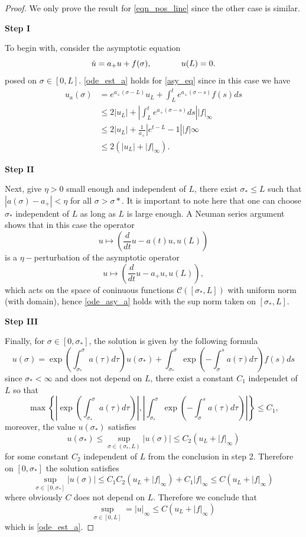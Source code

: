 \documentclass[letterpaper,11pt]{article}
\numberwithin{equation}{section}
\theoremstyle{plain}
\begin{document}
\begin{proof}
We only prove the result for \eqref{eqn_pos_line} since the other case is similar. 

\textbf{Step I}

To begin with, consider the asymptotic equation 
\begin{equation}\label{asy_eq}
\dot{u} = a_+ u + f(\sigma),\hspace{ 0.5in } u(L) = 0.
\end{equation}
posed on $\sigma \in [0, L]$.
\eqref{ode_est_a} holds for \eqref{asy_eq} since in this case we have
\begin{align*}
u_a(\sigma) &= e^{a_+(\sigma-L)}u_L + \int_L^t e^{a_+(\sigma-s)} f(s)ds \\ 
&\le 2|u_L| + \left|\int_L^t e^{a_+(\sigma-s)}ds \right| |f|_\infty\\ 
&\le  2|u_L|+\frac{1}{a_+} \left|e^{t-L}-1\right||f|\infty\\
& \le 2(|u_L|+|f|_\infty ).
\end{align*}

\textbf{Step II}

Next, give $\eta>0$ small enough and independent of $L$, there exist $\sigma_* \le L$ such that $|a(\sigma)- a_+|< \eta$ for all $\sigma>\sigma*$. It is important to note here that one can choose $\sigma_*$ independent of $L$ as long as $L$ is large enough. A Neuman series argument shows that in this case the operator 
\[ u \mapsto
 \left(\frac{d}{dt}u-a(t)u, u(L)\right)
\] is a $\eta-$perturbation of the asymptotic operator
\[ u \mapsto
 \left(\frac{d}{dt}u-a_+u, u(L)\right),
\]
which acts on the space of coninuous functions $\mathcal{C}([\sigma_*,L])$ with uniform norm (with domain), hence \eqref{ode_asy_a} holds with the sup norm taken on $[\sigma_*, L]$.

\textbf{Step III}

Finally, for $\sigma \in [0,\sigma_*]$, the solution is given by the following formula
\[
u(\sigma) = \exp\left(\int^{\sigma}_{\sigma_*} a(\tau)d\tau\right) u(\sigma_*) + \int_{\sigma_*}^{\sigma} \exp\left(-\int_{\sigma}^{s}a(\tau)d\tau\right)f(s)ds 
\]
since $\sigma_*< \infty$ and does not depend on $L$, there exist a constant $C_1$ independet of $L$ so that 
\[
\max\left\{ \left|\exp\left(\int^{\sigma}_{\sigma_*} a(\tau)d\tau\right)\right|, \left| \int_{\sigma_*}^{\sigma} \exp\left(-\int_{\sigma}^{s}a(\tau)d\tau\right)\right| \right\} \le C_1,
\]
moreover, the value $u(\sigma_*)$ satisfies
\[
u(\sigma_*) \le \sup_{\sigma \in (\sigma_*,L)} |u(\sigma)| \le C_2(u_L + |f|_\infty)
\]
for some constant $C_2$ independent of $L$ from the conclusion in step 2.
Therefore on $[0,\sigma_*]$ the solution satisfies
\[
\sup_{\sigma \in [0,\sigma_*]}|u(\sigma)| \le C_1C_2(u_L+|f|_\infty) +C_1|f|_\infty \le C(u_L+|f|_\infty)
\]
where obviously $C$ does not depend on $L$. Therefore we conclude that
\[
\sup_{\sigma \in [0,L]} = |u|_\infty \le C(u_L+|f|_\infty)
\]
which is \eqref{ode_est_a}.
\end{proof}
\end{document}
